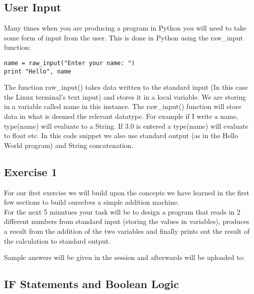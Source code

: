 \documentclass[twocolumn]{article}
\begin{document}
\subsection{User Input}
Many times when you are producing a program in Python you will need to take some form of input from the user. This is done in Python using the raw\_input function:
\begin{lstlisting}
name = raw_input("Enter your name: ") 
print "Hello", name
\end{lstlisting}
The function raw\_input() takes data written to the standard input (In this case the Linux terminal's text input) and stores it in a local variable. We are storing in a variable called name in this instance. The raw\_input() function will store data in what is deemed the relevant datatype. For example if I write a name, type(name) will evaluate to a String. If 3.0 is entered a type(name) will evaluate to float etc. In this code snippet we also use standard output (as in the Hello World program) and String concatenation. 

\subsection{Exercise 1}

For our first exercise we will build upon the concepts we have learned in the first few sections to build ourselves a simple addition machine.\\ For the next 5 minutues your task will be to design a program that reads in 2 different numbers from standard input (storing the values in variables), produces a result from the addition of the two variables and finally prints out the result of the calculation to standard output.

Sample answers will be given in the session and afterwards will be uploaded to:

\subsection{IF Statements and Boolean Logic}
\end{document}
